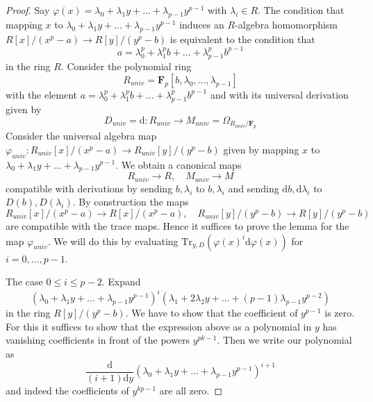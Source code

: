 \begin{proof}
Say $\varphi(x) = \lambda_0 + \lambda_1 y + \ldots + \lambda_{p - 1}y^{p - 1}$
with $\lambda_i \in R$. The condition that mapping $x$ to
$\lambda_0 + \lambda_1 y + \ldots + \lambda_{p - 1}y^{p - 1}$
induces an $R$-algebra homomorphism $R[x]/(x^p - a) \to R[y]/(y^p - b)$
is equivalent to the condition that
$$
a = \lambda_0^p + \lambda_1^p b + \ldots + \lambda_{p - 1}^pb^{p - 1}
$$
in the ring $R$. Consider the polynomial ring
$$
R_{univ} = \mathbf{F}_p[b, \lambda_0, \ldots, \lambda_{p - 1}]
$$
with the element
$a = \lambda_0^p + \lambda_1^p b + \ldots + \lambda_{p - 1}^pb^{p - 1}$
and
with its universal derivation given by
$$
D_{univ} = \text{d} :
R_{univ}
\longrightarrow
M_{univ} = \Omega_{R_{univ}/\mathbf{F}_p}
$$
Consider the universal algebra map
$\varphi_{univ} : R_{univ}[x]/(x^p - a) \to R_{univ}[y]/(y^p - b)$
given by mapping $x$ to
$\lambda_0 + \lambda_1 y + \ldots + \lambda_{p - 1}y^{p - 1}$.
We obtain a canonical maps
$$
R_{univ} \longrightarrow R,\quad
M_{univ} \longrightarrow M
$$
compatible with derivations by sending $b, \lambda_i$ to $b, \lambda_i$
and sending $\text{d}b, \text{d}\lambda_i$ to $D(b), D(\lambda_i)$.
By construction the maps
$$
R_{univ}[x]/(x^p - a) \to R[x]/(x^p - a),\quad
R_{univ}[y]/(y^p - b) \to R[y]/(y^p - b)
$$
are compatible with the trace maps. Hence it suffices to prove the
lemma for the map $\varphi_{univ}$. We will do this by evaluating
$\text{Tr}_{y, D}(\varphi(x)^i\text{d}\varphi(x))$ for $i = 0 , \ldots, p - 1$.

\medskip\noindent
The case $0 \leq i \leq p - 2$. Expand
$$
(\lambda_0 + \lambda_1 y + \ldots + \lambda_{p - 1}y^{p - 1})^i
(\lambda_1 + 2 \lambda_2 y + \ldots + (p - 1)\lambda_{p - 1}y^{p - 2})
$$
in the ring $R[y]/(y^p - b)$. We have to show that the coefficient
of $y^{p - 1}$ is zero. For this it suffices to show that
the expression above as a polynomial in $y$ has vanishing
coefficients in front of the powers $y^{pk - 1}$.
Then we write our polynomial as
$$
\frac{\text{d}}{(i + 1)\text{d}y}
(\lambda_0 + \lambda_1 y + \ldots + \lambda_{p - 1}y^{p - 1})^{i + 1}
$$
and indeed the coefficients of $y^{kp - 1}$ are all zero.


\end{proof}

